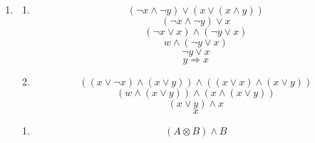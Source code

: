 \documentclass[a4paper]{article}
\begin{document}
\begin{enumerate}
		\item
		\begin{enumerate}
			\item
			\begin{equation*}
				(\lnot x \land \lnot y) \lor (x \lor (x \land y))
			\end{equation*}
			\begin{equation*}
				(\lnot x \land \lnot y) \lor x
			\end{equation*}
			\begin{equation*}
				(\lnot x \lor x) \land (\lnot y \lor x)
			\end{equation*}
			\begin{equation*}
				w \land (\lnot y \lor x)
			\end{equation*}
			\begin{equation*}
				\lnot y \lor x
			\end{equation*}
			\begin{equation*}
				y \Rightarrow x
			\end{equation*}
			
			\item
			\begin{equation*}
				((x \lor \lnot x) \land (x \lor y)) \land ((x \lor x) \land (x \lor y))
			\end{equation*}
			\begin{equation*}
				(w \land (x \lor y)) \land (x \land (x \lor y))
			\end{equation*}
			\begin{equation*}
				(x \lor y) \land x
			\end{equation*}
			\begin{equation*}
				x
			\end{equation*}
		\end{enumerate}
		
		\begin{enumerate}
			\item
			\begin{equation*}
				(A \otimes B) \land B
			\end{equation*}
			

\end{enumerate}
\end{enumerate}
\end{document}
